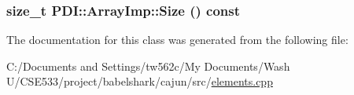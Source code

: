 \hypertarget{class_p_d_i_1_1_array_imp_54f76deea4195d54053b8fb00fa73655}{
\subsubsection[{Size}]{\setlength{\rightskip}{0pt plus 5cm}size\_\-t PDI::ArrayImp::Size () const}}
\label{class_p_d_i_1_1_array_imp_54f76deea4195d54053b8fb00fa73655}




The documentation for this class was generated from the following file:\begin{CompactItemize}
\item 
C:/Documents and Settings/tw562c/My Documents/Wash U/CSE533/project/babelshark/cajun/src/\hyperlink{elements_8cpp}{elements.cpp}\end{CompactItemize}
